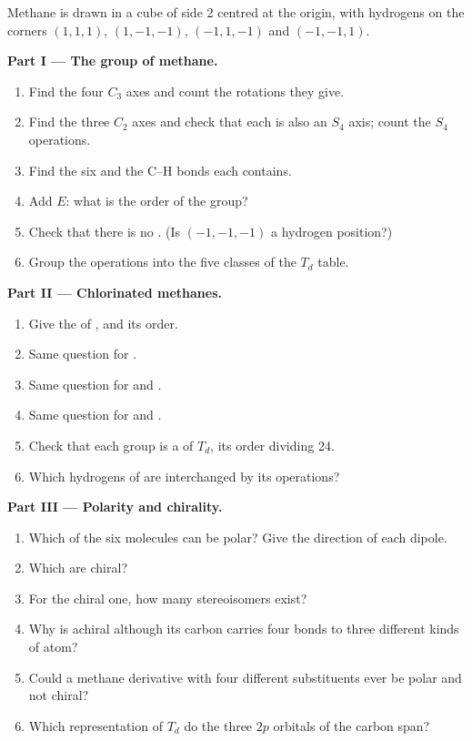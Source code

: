 \begin{problem}
\label{pb:b3:point-groups:1}
Methane is drawn in a cube of side 2 centred at the origin, with hydrogens
on the corners $(1,1,1)$, $(1,-1,-1)$, $(-1,1,-1)$ and $(-1,-1,1)$.

\medskip\noindent\textbf{Part I --- The group of methane.}
\begin{enumerate}
  \item Find the four $C_3$ axes and count the rotations they give.
  \item Find the three $C_2$ axes and check that each is also an $S_4$ axis;
        count the $S_4$ operations.
  \item Find the six  and the C--H bonds each contains.
  \item Add $E$: what is the order of the group?
  \item Check that there is no . (Is $(-1,-1,-1)$ a hydrogen
        position?)
  \item Group the operations into the five classes of the $T_d$ table.
\end{enumerate}

\medskip\noindent\textbf{Part II --- Chlorinated methanes.}
\begin{enumerate}[resume]
  \item Give the  of , and its order.
  \item Same question for .
  \item Same question for  and .
  \item Same question for  and .
  \item Check that each group is a  of $T_d$, its order dividing 24.
  \item Which hydrogens of  are interchanged by its operations?
\end{enumerate}

\medskip\noindent\textbf{Part III --- Polarity and chirality.}
\begin{enumerate}[resume]
  \item Which of the six molecules can be polar? Give the direction of each
        dipole.
  \item Which are chiral?
  \item For the chiral one, how many stereoisomers exist?
  \item Why is  achiral although its carbon carries four bonds to
        three different kinds of atom?
  \item Could a methane derivative with four different substituents ever be
        polar and not chiral?
  \item Which representation of $T_d$ do the three $2p$ orbitals of the carbon
        span?
\end{enumerate}


\end{problem}
